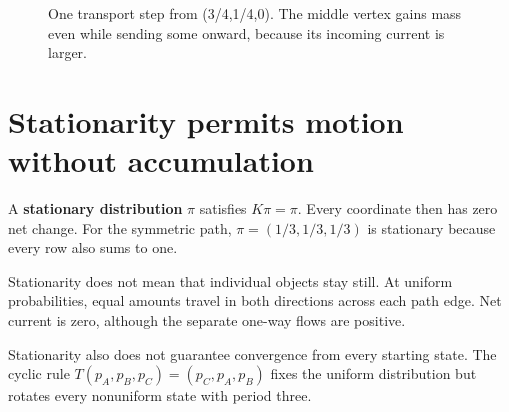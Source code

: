\documentclass[11pt,oneside,openany]{book}
\theoremstyle{definition}
\theoremstyle{remark}
\numberwithin{equation}{chapter}
\begin{document}
\begin{figure}[htbp]\centering
{}
\caption{One transport step from (3/4,1/4,0). The middle vertex gains mass even while sending some onward, because its incoming current is larger.}\end{figure}

\section{Stationarity permits motion without accumulation}\label{ch04-stationarity-permits-motion-without-accumulation}

A \textbf{stationary distribution} \(\pi\) satisfies \(K\pi=\pi\). Every coordinate then has zero net change. For the symmetric path, \(\pi=(1/3,1/3,1/3)\) is stationary because every row also sums to one.

Stationarity does not mean that individual objects stay still. At uniform probabilities, equal amounts travel in both directions across each path edge. Net current is zero, although the separate one-way flows are positive.

Stationarity also does not guarantee convergence from every starting state. The cyclic rule \(T(p_A,p_B,p_C)=(p_C,p_A,p_B)\) fixes the uniform distribution but rotates every nonuniform state with period three.
\end{document}
